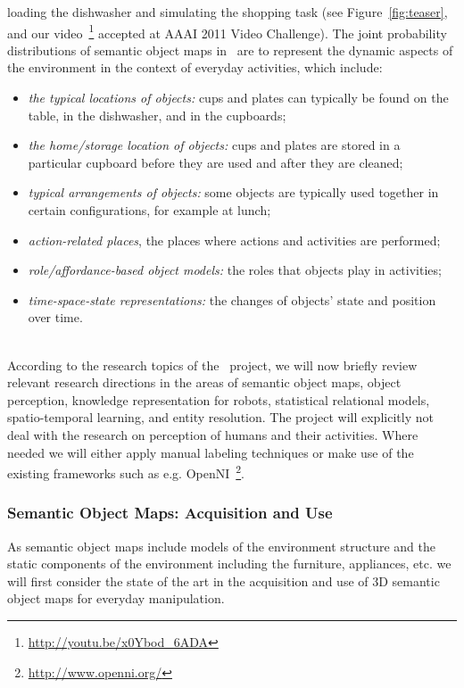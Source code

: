 loading  the  dishwasher and simulating the shopping task (see Figure~\ref{fig:teaser}, and 
our video~\footnote{\url{http://youtu.be/x0Ybod_6ADA}} accepted at AAAI 2011 Video Challenge).
The joint probability distributions of semantic object maps in \ksem\ are to represent the
dynamic aspects of the environment in the context of everyday
activities, which include:
\begin{itemize}
\item \emph{the typical locations of objects:} cups and plates can
  typically be found on the table, in the dishwasher, and in the
  cupboards;
\item \emph{the home/storage location of objects:} cups and plates are
  stored in a particular cupboard before they are used and after they
  are cleaned;
\item \emph{typical arrangements of objects:} some objects are
  typically used together in certain configurations, for example
  at lunch; %
\item \emph{action-related places}, the places where actions and
  activities are performed;
\item \emph{role/affordance-based object models:} the roles that
  objects play in activities;
\item \emph{time-space-state representations:} the changes of
  objects' state and position over time.
\end{itemize}

\\
According to the research topics of the \ksem\ project, we will now
briefly review relevant research directions in the areas of semantic
object maps, object perception, knowledge representation for robots, statistical relational models,
spatio-temporal learning, and entity resolution. The project will
explicitly not deal with the research on perception of humans and their activities.
Where needed we will either apply manual labeling techniques or make use 
of the existing frameworks such as e.g. OpenNI~\footnote{\url{http://www.openni.org/}}.
\subsubsection{Semantic Object Maps: Acquisition and Use}
\label{sec:soms}
As semantic object maps include models of the environment structure and the static
components of the environment including the furniture, appliances,
etc. we will first consider the state of the art in the acquisition
and use of 3D semantic object maps for everyday manipulation.

